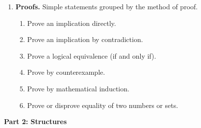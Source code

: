 \documentclass[a4paper,12pt]{article}
\begin{document}
{\begin{enumerate}
\begin{enumerate}
\end{enumerate}
\item \textbf{Proofs.} Simple statements grouped by the method of proof.
\begin{enumerate}
\item Prove an implication directly.
\item Prove an implication by contradiction.
\item Prove a logical equivalence (if and only if).
\item Prove by counterexample.
\item Prove by mathematical induction.
\item Prove or disprove equality of two numbers or sets.
\end{enumerate}
\end{enumerate}
}


\vspace{10pt}
{\bf Part 2: Structures}
\end{document}
